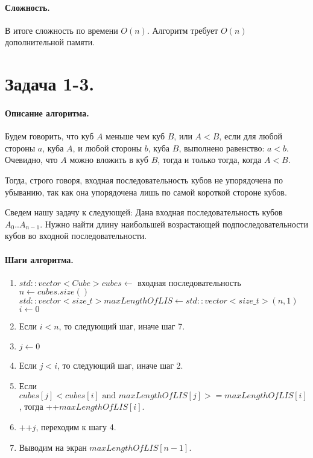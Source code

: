 \documentclass[12pt]{article}
\begin{document}
\paragraph{Сложность.}
В итоге сложность по времени $O(n)$. Алгоритм требует $O(n)$ дополнительной памяти.




\section{Задача 1-3.} 
\paragraph{Описание алгоритма.}
Будем говорить, что куб $ A $ меньше чем куб $ B $, или $ A < B $, если для любой стороны $ a $, куба $ A $,
и любой стороны $ b $, куба $ B $, выполнено равенство: $ a < b $.
Очевидно, что $ A $ можно вложить в куб $ B $, тогда и только тогда, когда $ A < B $.

Тогда, строго говоря, входная последовательность кубов не упорядочена по убыванию, так как она упорядочена лишь
по самой короткой стороне кубов. 

Сведем нашу задачу к следующей: Дана входная последовательность кубов $A_0..A_{n-1}$.
Нужно найти длину наибольшей возрастающей подпоследовательности кубов во входной последовательности.

\paragraph{Шаги алгоритма.}
\begin{enumerate}
    \item $ std::vector<Cube> cubes \leftarrow \mbox{ входная последовательность} $ \\
          $ n \leftarrow cubes.size() $ \\
          $ std::vector<size\_t> maxLengthOfLIS \leftarrow std::vector<size\_t>(n, 1)$ \\
          $ i \leftarrow 0 $
    \item Если $ i < n $, то следующий шаг, иначе шаг 7.
    \item $ j \leftarrow 0 $
    \item Если $ j < i $, то следующий шаг, иначе шаг 2.
    \item Если $ cubes[j] < cubes[i] \mbox{   and   } maxLengthOfLIS[j] >= maxLengthOfLIS[i] $, тогда ++$ maxLengthOfLIS[i] $.
    \item ++$j$, переходим к шагу 4.
    \item Выводим на экран $ maxLengthOfLIS[n - 1] $.
\end{enumerate}
\end{document}
